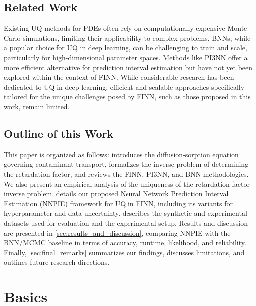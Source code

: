 \section{Related Work}
Existing UQ methods for PDEs often rely on computationally expensive Monte Carlo simulations, limiting their applicability to complex problems. BNNs, while a popular choice for UQ in deep learning, can be challenging to train and scale, particularly for high-dimensional parameter spaces. Methods like PI3NN offer a more efficient alternative for prediction interval estimation but have not yet been explored within the context of FINN. While considerable research has been dedicated to UQ in deep learning, efficient and scalable approaches specifically tailored for the unique challenges posed by FINN, such as those proposed in this work, remain limited.



\section{Outline of this Work}
This paper is organized as follows:  introduces the diffusion-sorption equation governing contaminant transport, formalizes the inverse problem of determining the retardation factor, and reviews the FINN, PI3NN, and BNN methodologies. We also present an empirical analysis of the uniqueness of the retardation factor inverse problem.  details our proposed Neural Network Prediction Interval Estimation (NNPIE) framework for UQ in FINN, including its variants for hyperparameter and data uncertainty.  describes the synthetic and experimental datasets used for evaluation and the experimental setup. Results and discussion are presented in \cref{sec:results_and_discussion}, comparing NNPIE with the BNN/MCMC baseline in terms of accuracy, runtime, likelihood, and reliability. Finally, \cref{sec:final_remarks} summarizes our findings, discusses limitations, and outlines future research directions.



\chapter{Basics}
\label{sec:basics}

